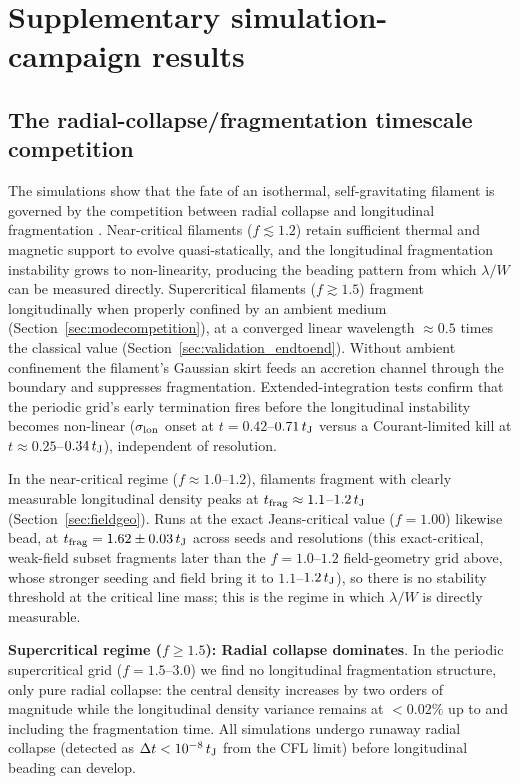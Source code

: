 \documentclass[usenatbib,twoside,twocolumn]{mnras}
\begin{document}
\section{Supplementary simulation-campaign results}
\label{sec:supplementary_campaigns_app}

\subsection{The radial-collapse/fragmentation timescale competition}
\label{sec:regimes}

The simulations show that the fate of an isothermal, self-gravitating filament is governed by the competition between radial collapse and longitudinal fragmentation \citep{Inutsuka1997, Pon2012}. Near-critical filaments ($f\lesssim1.2$) retain sufficient thermal and magnetic support to evolve quasi-statically, and the longitudinal fragmentation instability grows to non-linearity, producing the beading pattern from which $\lambda/W$ can be measured directly. Supercritical filaments ($f\gtrsim1.5$) fragment longitudinally when properly confined by an ambient medium (Section~\ref{sec:modecompetition}), at a converged linear wavelength $\approx0.5$ times the classical value (Section~\ref{sec:validation_endtoend}). Without ambient confinement the filament's Gaussian skirt feeds an accretion channel through the boundary and suppresses fragmentation. Extended-integration tests confirm that the periodic grid's early termination fires before the longitudinal instability becomes non-linear ($\sigma_{\rm lon}$ onset at $t=0.42$--$0.71\,t_{\rm J}$ versus a Courant-limited kill at $t\approx0.25$--$0.34\,t_{\rm J}$), independent of resolution.

In the near-critical regime ($f\approx1.0$--$1.2$), filaments fragment with clearly measurable longitudinal density peaks at $t_{\rm frag}\approx1.1$--$1.2\,t_{\rm J}$ (Section~\ref{sec:fieldgeo}). Runs at the exact Jeans-critical value ($f=1.00$) likewise bead, at $t_{\rm frag}=1.62\pm0.03\,t_{\rm J}$ across seeds and resolutions (this exact-critical, weak-field subset fragments later than the $f=1.0$--$1.2$ field-geometry grid above, whose stronger seeding and field bring it to $1.1$--$1.2\,t_{\rm J}$), so there is no stability threshold at the critical line mass; this is the regime in which $\lambda/W$ is directly measurable.

\textbf{Supercritical regime ($f \geq 1.5$): Radial collapse dominates}. In the periodic supercritical grid ($f=1.5$--$3.0$) we find no longitudinal fragmentation structure, only pure radial collapse: the central density increases by two orders of magnitude while the longitudinal density variance remains at $<0.02\%$ up to and including the fragmentation time. All simulations undergo runaway radial collapse (detected as $\Delta t < 10^{-8}\,t_{\rm J}$ from the CFL limit) before longitudinal beading can develop.
\end{document}
